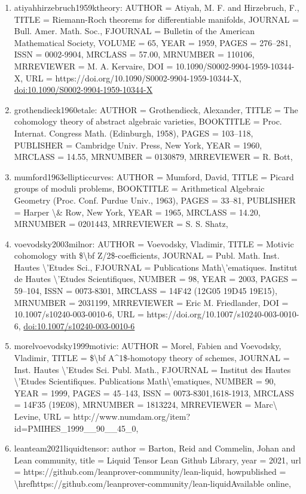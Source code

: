 \documentclass[11pt]{article}
\begin{document}
\begin{enumerate}[leftmargin=*]
  \item atiyahhirzebruch1959ktheory: AUTHOR = Atiyah, M. F. and Hirzebruch, F., TITLE = Riemann-Roch theorems for differentiable manifolds, JOURNAL = Bull. Amer. Math. Soc., FJOURNAL = Bulletin of the American Mathematical Society, VOLUME = 65, YEAR = 1959, PAGES = 276--281, ISSN = 0002-9904, MRCLASS = 57.00, MRNUMBER = 110106, MRREVIEWER = M. A. Kervaire, DOI = 10.1090/S0002-9904-1959-10344-X, URL = https://doi.org/10.1090/S0002-9904-1959-10344-X, \href{https://doi.org/10.1090/S0002-9904-1959-10344-X}{doi:10.1090/S0002-9904-1959-10344-X}
  \item grothendieck1960etale: AUTHOR = Grothendieck, Alexander, TITLE = The cohomology theory of abstract algebraic varieties, BOOKTITLE = Proc. Internat. Congress Math. (Edinburgh, 1958), PAGES = 103--118, PUBLISHER = Cambridge Univ. Press, New York, YEAR = 1960, MRCLASS = 14.55, MRNUMBER = 0130879, MRREVIEWER = R. Bott,
  \item mumford1963ellipticcurves: AUTHOR = Mumford, David, TITLE = Picard groups of moduli problems, BOOKTITLE = Arithmetical Algebraic Geometry (Proc. Conf. Purdue Univ., 1963), PAGES = 33--81, PUBLISHER = Harper \textbackslash{}\& Row, New York, YEAR = 1965, MRCLASS = 14.20, MRNUMBER = 0201443, MRREVIEWER = S. S. Shatz,
  \item voevodsky2003milnor: AUTHOR = Voevodsky, Vladimir, TITLE = Motivic cohomology with \$\textbackslash{}bf Z/2\$-coefficients, JOURNAL = Publ. Math. Inst. Hautes \textbackslash{}'Etudes Sci., FJOURNAL = Publications Math\textbackslash{}'ematiques. Institut de Hautes \textbackslash{}'Etudes Scientifiques, NUMBER = 98, YEAR = 2003, PAGES = 59--104, ISSN = 0073-8301, MRCLASS = 14F42 (12G05 19D45 19E15), MRNUMBER = 2031199, MRREVIEWER = Eric M. Friedlander, DOI = 10.1007/s10240-003-0010-6, URL = https://doi.org/10.1007/s10240-003-0010-6, \href{https://doi.org/10.1007/s10240-003-0010-6}{doi:10.1007/s10240-003-0010-6}
  \item morelvoevodsky1999motivic: AUTHOR = Morel, Fabien and Voevodsky, Vladimir, TITLE = \$\textbackslash{}bf A\^{}1\$-homotopy theory of schemes, JOURNAL = Inst. Hautes \textbackslash{}'Etudes Sci. Publ. Math., FJOURNAL = Institut des Hautes \textbackslash{}'Etudes Scientifiques. Publications Math\textbackslash{}'ematiques, NUMBER = 90, YEAR = 1999, PAGES = 45--143, ISSN = 0073-8301,1618-1913, MRCLASS = 14F35 (19E08), MRNUMBER = 1813224, MRREVIEWER = Marc\textbackslash{} Levine, URL = http://www.numdam.org/item?id=PMIHES\_1999\_\_90\_\_45\_0,
  \item leanteam2021liquidtensor: author = Barton, Reid and Commelin, Johan and Lean community, title = Liquid Tensor Lean Github Library, year = 2021, url = https://github.com/leanprover-community/lean-liquid, howpublished = \textbackslash{}hrefhttps://github.com/leanprover-community/lean-liquidAvailable online,

\end{enumerate}
\end{document}

